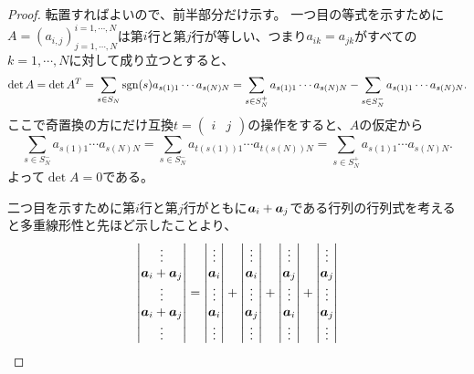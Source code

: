 \begin{proof}
転置すればよいので、前半部分だけ示す。
一つ目の等式を示すために$A = (a_{i, j})^{i = 1, \cdots, N}_{j = 1, \cdots, N}$は第$i$行と第$j$行が等しい、つまり$a_{i k} = a_{j k}$がすべての$k = 1, \cdots, N$に対して成り立つとすると、
$$
\det A
= \det A^T
= \sum_{s \in S_N}\operatorname{sgn}(s) a_{s(1) 1}\cdots a_{s(N) N}
= \sum_{s \in S_N^+}a_{s(1) 1}\cdots a_{s(N) N}-\sum_{s \in S_N^-}a_{s(1) 1}\cdots a_{s(N) N}.
$$
ここで奇置換の方にだけ互換$t = \begin{pmatrix}i & j\end{pmatrix}$の操作をすると、$A$の仮定から
$$
\sum_{s \in S_N^-}a_{s(1) 1}\cdots a_{s(N) N}
= \sum_{s \in S_N^-}a_{t(s(1)) 1}\cdots a_{t(s(N)) N}
= \sum_{s \in S_N^+}a_{s(1) 1}\cdots a_{s(N) N}.
$$
よって$\det A = 0$である。

二つ目を示すために第$i$行と第$j$行がともに$\vb*{a}_i+\vb*{a}_j$である行列の行列式を考えると多重線形性と先ほど示したことより、
$$
\begin{vmatrix}\vdots \\ \vb*{a}_i+\vb*{a}_j \\ \vdots \\ \vb*{a}_i+\vb*{a}_j \\ \vdots\end{vmatrix}
=
\begin{vmatrix}\vdots \\ \vb*{a}_i \\ \vdots \\ \vb*{a}_i \\ \vdots\end{vmatrix}
+\begin{vmatrix}\vdots \\ \vb*{a}_i \\ \vdots \\ \vb*{a}_j \\ \vdots\end{vmatrix}
+\begin{vmatrix}\vdots \\ \vb*{a}_j \\ \vdots \\ \vb*{a}_i \\ \vdots\end{vmatrix}
+\begin{vmatrix}\vdots \\ \vb*{a}_j \\ \vdots \\ \vb*{a}_j \\ \vdots\end{vmatrix}
$$
\end{proof}
